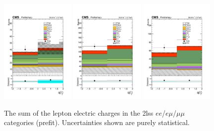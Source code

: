 \begin{figure}[htp]
\centering
\includegraphics[width=0.32\textwidth]{ch5_figs/qSum_ttH_ee_stackPlot_SR.pdf}
\includegraphics[width=0.32\textwidth]{ch5_figs/qSum_ttH_em_stackPlot_SR.pdf}
\includegraphics[width=0.32\textwidth]{ch5_figs/qSum_ttH_mm_stackPlot_SR.pdf} \\
\caption[Data/MC comparison of sum of the lepton electric charges in the signal region]{The sum of the lepton electric charges in the 2lss $ee$/$e\mu$/$\mu\mu$ categories (prefit). Uncertainties shown are purely statistical.}
\label{fig:sr_qsum}
\end{figure}

